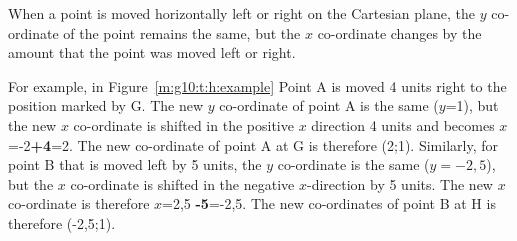 \documentclass[10pt,a4paper,titlepage,twoside,openright]{report}
\begin{document}

When a point is moved horizontally left or right on the Cartesian plane, the $y$ co-ordinate of the point remains the same, but the $x$ co-ordinate changes by the amount that the point was moved left or right. 

For example, in Figure~\ref{m:g10:t:h:example} Point A is moved 4 units right to the position marked by G. The new $y$ co-ordinate of point A is the same ($y$=1), but the new $x$ co-ordinate is shifted in the positive $x$ direction 4 units and becomes $x$=-2\textbf{+4}=2. The new co-ordinate of point A at G is therefore (2;1). Similarly, for point B that is moved left by 5 units, the $y$ co-ordinate is the same ($y=-2,5$), but the $x$ co-ordinate is shifted in the negative $x$-direction by 5 units. The new $x$ co-ordinate is therefore $x$=2,5 \textbf{-5}=-2,5. The new co-ordinates of point B at H is therefore (-2,5;1).
\end{document}
